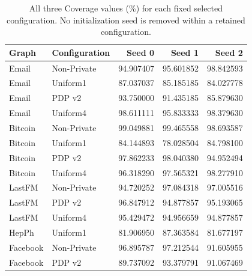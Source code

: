 \begin{table}[htbp]
\centering\small
\caption{All three Coverage values (\%) for each fixed selected configuration. No initialization seed is removed within a retained configuration.}\label{tab:frozenseeds}
\begin{tabular}{llrrr}
\toprule
Graph & Configuration & Seed 0 & Seed 1 & Seed 2\\ \midrule
Email & Non-Private & 94.907407 & 95.601852 & 98.842593 \\
Email & Uniform1 & 87.037037 & 85.185185 & 84.027778 \\
Email & PDP v2 & 93.750000 & 91.435185 & 85.879630 \\
Email & Uniform4 & 98.611111 & 95.833333 & 98.379630 \\
Bitcoin & Non-Private & 99.049881 & 99.465558 & 98.693587 \\
Bitcoin & Uniform1 & 84.144893 & 78.028504 & 84.798100 \\
Bitcoin & PDP v2 & 97.862233 & 98.040380 & 94.952494 \\
Bitcoin & Uniform4 & 96.318290 & 97.565321 & 98.277910 \\
LastFM & Non-Private & 94.720252 & 97.084318 & 97.005516 \\
LastFM & PDP v2 & 96.847912 & 94.877857 & 95.193065 \\
LastFM & Uniform4 & 95.429472 & 94.956659 & 94.877857 \\
HepPh & Uniform1 & 81.906950 & 87.363584 & 81.677197 \\
Facebook & Non-Private & 96.895787 & 97.212544 & 91.605955 \\
Facebook & PDP v2 & 89.737092 & 93.379791 & 91.067469 \\
\bottomrule\end{tabular}
\end{table}
